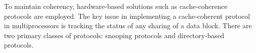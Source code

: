To maintain coherency, hardware-based solutions such as cache-coherence protocols are employed. 
The key issue in implementing a cache-coherent protocol in multiprocessors is tracking the status of any sharing of a data block. 
There are two primary classes of protocols: snooping protocols and directory-based protocols.